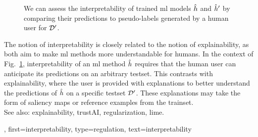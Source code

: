 {{\begin{figure}[H]
\begin{center}
 		\caption{We can assess the interpretability of trained \gls{ml} \glspl{model} 
 			$\hat{h}$ and $\hat{h}'$ by comparing their \glspl{prediction} 
			to pseudo-\glspl{label} generated by a human user for $\mathcal{D}'$. 
			\label{fig_aug_simulatability_dict}}
 			\end{center}
	 	\end{figure} 
 	 	The notion of interpretability is closely related to the notion of \gls{explainability}, 
 	 	as both aim to make \gls{ml} methods more understandable for humans. 
		In the context of Fig.\ \ref{fig_aug_simulatability_dict}, interpretability of an \gls{ml} 
	 	method $\hat{h}$ requires that the human user can anticipate its \glspl{prediction} 
	 	on an arbitrary \gls{testset}. This contrasts with \gls{explainability}, 
		where the user is provided with \glspl{explanation} to better understand the \glspl{prediction}
		of $\hat{h}$ on a specific \gls{testset} $\mathcal{D}'$. These \glspl{explanation} 
		may take the form of saliency \glspl{map} or reference examples from the \gls{trainset}.
	 	\\ 
	 	See also: \gls{explainability}, \gls{trustAI}, \gls{regularization}, \gls{lime}. },
	first={interpretability},
	type=regulation, 
 	text={interpretability}
}

